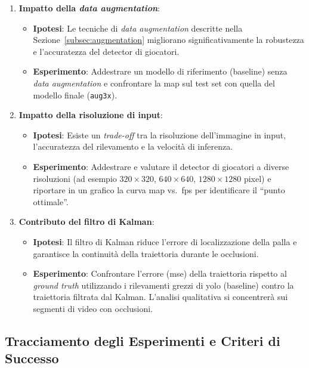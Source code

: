 \documentclass[12pt,a4paper,openright,twoside]{book}
\begin{document}
\begin{enumerate}
  \item \textbf{Impatto della \emph{data augmentation}}:
  \begin{itemize}
    \item \textbf{Ipotesi}: Le tecniche di \emph{data augmentation} descritte nella Sezione~\ref{subsec:augmentation} migliorano significativamente
    la robustezza e l'accuratezza del detector di giocatori.
    \item \textbf{Esperimento}: Addestrare un modello di riferimento (baseline) senza \emph{data augmentation} e confrontare la \ac{map}
    sul test set con quella del modello finale (\texttt{aug3x}).
  \end{itemize}
  \item \textbf{Impatto della risoluzione di input}:
  \begin{itemize}
    \item \textbf{Ipotesi}: Esiste un \emph{trade-off} tra la risoluzione dell'immagine in input, l'accuratezza del rilevamento e
    la velocità di inferenza.
    \item \textbf{Esperimento}: Addestrare e valutare il detector di giocatori a diverse risoluzioni (ad esempio $320\times320$, $640\times640$,
    $1280\times1280$ pixel) e riportare in un grafico la curva \ac{map} vs.~\ac{fps} per identificare il ``punto ottimale''.
  \end{itemize}
  \item \textbf{Contributo del filtro di Kalman}:
  \begin{itemize}
    \item \textbf{Ipotesi}: Il filtro di Kalman riduce l'errore di localizzazione della palla e garantisce la continuità
    della traiettoria durante le occlusioni.
    \item \textbf{Esperimento}: Confrontare l'errore (\ac{mse}) della traiettoria rispetto al \emph{ground truth} utilizzando i
    rilevamenti grezzi di \ac{yolo} (baseline) contro la traiettoria filtrata dal Kalman. L'analisi qualitativa
    si concentrerà sui segmenti di video con occlusioni.
  \end{itemize}
\end{enumerate}

\subsection{Tracciamento degli Esperimenti e Criteri di Successo}
\label{sec:tracciamento-esperimenti-criteri}
\end{document}

